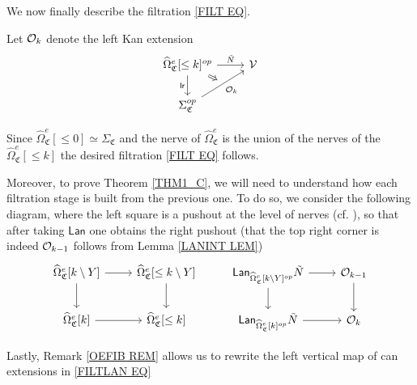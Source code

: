 \documentclass[a4paper,10pt
,draft
]{article}%
\renewcommand{\1}{\eta}%
\newcommand{\SC}{\Sigma_{\mathfrak C}}
\begin{document}
We now finally describe the filtration \eqref{FILT EQ}.
\begin{definition}\label{FILTSTAGE DEF}
Let $\mathcal{O}_k$ denote the left Kan extension
\begin{equation}
\begin{tikzcd}
	|[alias = A]|
	\widehat\Omega_{\mathfrak C}^e[\leq k]^{op}
	\arrow[r, "\tilde N"] \arrow[d, "\mathsf{lr}"']
&
	\V
\\
	\SC^{op}
	\arrow[ur, "\O_k"', ""{name = B}]
	\arrow[Rightarrow, from = A, to = B]
\end{tikzcd}
\end{equation}
\end{definition}

Since $\widehat\Omega_{\mathfrak C}^e[\leq 0] \simeq \SC$
and the nerve of $\widehat \Omega_{\mathfrak C}^e$ is the union of the nerves of the $\widehat\Omega_{\mathfrak C}^e[\leq k]$
the desired filtration \eqref{FILT EQ} follows.


Moreover, to prove Theorem \ref{THM1_C}, we will need to
understand how each filtration stage is built from the previous one.
To do so, we consider the following diagram, where the left square is a pushout at the level of nerves (cf. \cite[(5.65)]{BP_geo}),
so that after taking $\mathsf{Lan}$
one obtains the right pushout
(that the top right corner is indeed $\mathcal{O}_{k-1}$ follows from Lemma \ref{LANINT LEM})
\begin{equation}\label{FILTLAN EQ}
\begin{tikzcd}
		\widehat\Omega_{\mathfrak C}^e[k \setminus Y] \arrow[r] \arrow[d]
	&
		\widehat\Omega_{\mathfrak C}^e[\leq k \setminus Y] \arrow[d]
&
		\mathsf{Lan}_{\widehat\Omega_{\mathfrak C}^e[k \setminus Y]^{op}} \tilde N \arrow[r] \arrow[d]
	&
		\O_{k-1} \arrow[d]
\\
		\widehat\Omega_{\mathfrak C}^e[k] \arrow[r]
	&
		\widehat\Omega_{\mathfrak C}^e[\leq k]
&
		\mathsf{Lan}_{\widehat \Omega_{\mathfrak C}^e[k]^{op}} \tilde N \arrow[r]
	&
		\O_k
\end{tikzcd}
\end{equation}


Lastly, Remark \ref{OEFIB REM} allows us to 
rewrite the left vertical map of can extensions in \eqref{FILTLAN EQ}
\end{document}
